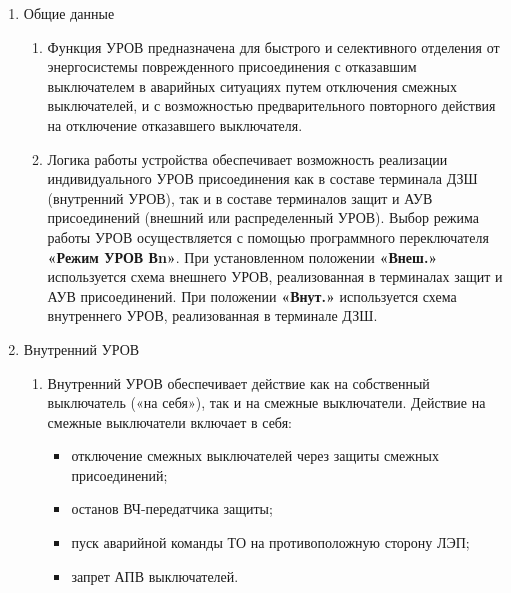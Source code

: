 \color{black}

\begin{enumerate}[label=\arabic{section}.\arabic{subsection}.\arabic{enumi}, labelsep=4pt, leftmargin=0pt, itemindent=57pt, itemsep=0pt, parsep=5pt] %


\item Общие данные

\begin{enumerate}[label=\arabic{section}.\arabic{subsection}.\arabic{enumi}.\arabic*, labelsep=4pt, leftmargin=0em, itemindent=65pt, parsep=0pt]

\item
Функция УРОВ предназначена для быстрого и селективного отделения от энергосистемы поврежденного присоединения с отказавшим выключателем в аварийных ситуациях путем отключения смежных выключателей, и с возможностью предварительного повторного действия на отключение отказавшего выключателя.

\item
Логика работы устройства обеспечивает возможность реализации индивидуального УРОВ присоединения как в составе терминала ДЗШ (внутренний УРОВ), так и в составе терминалов защит и АУВ присоединений (внешний или распределенный УРОВ).
Выбор режима работы УРОВ осуществляется с помощью программного переключателя \textbf{«Режим УРОВ Вn»}.
При установленном положении \textbf{«Внеш.»} используется схема внешнего УРОВ, реализованная в терминалах защит и АУВ присоединений.
При положении \textbf{«Внут.»} используется схема внутреннего УРОВ, реализованная в терминале ДЗШ.

\end {enumerate}


\item Внутренний УРОВ

\begin{enumerate}[label=\arabic{section}.\arabic{subsection}.\arabic{enumi}.\arabic*, labelsep=4pt, leftmargin=0em, itemindent=65pt, parsep=0pt]

\item
Внутренний УРОВ обеспечивает действие как на собственный выключатель («на себя»), так и на смежные выключатели.
Действие на смежные выключатели включает в себя:
\begin{itemize}
\item отключение смежных выключателей через защиты смежных присоединений;
\item останов ВЧ-передатчика защиты;
\item пуск аварийной команды ТО на противоположную сторону ЛЭП;
\item запрет АПВ выключателей.
\end{itemize}


\end{enumerate}
\end{enumerate}
